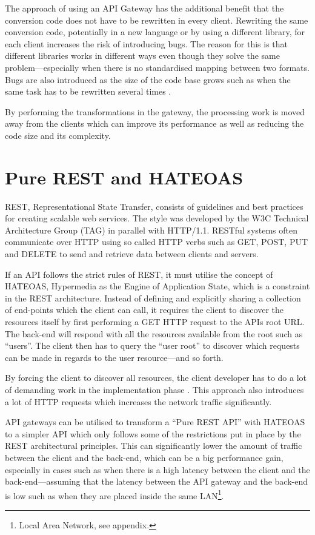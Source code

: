\documentclass{cslthse-msc}
\begin{document}
The approach of using an API Gateway has the additional benefit that the conversion code does not have to be rewritten in every client. Rewriting the same conversion code, potentially in a new language or by using a different library, for each client increases the risk of introducing bugs. The reason for this is that different libraries works in different ways even though they solve the same problem---especially when there is no standardised mapping between two formats. Bugs are also introduced as the size of the code base grows such as when the same task has to be rewritten several times \cite[page 521]{code_complete}. 

By performing the transformations in the gateway, the processing work is moved away from the clients which can improve its performance as well as reducing the code size and its complexity.

\section{Pure REST and HATEOAS}
REST, Representational State Transfer, consists of guidelines and best practices for creating scalable web services. The style was developed by the W3C Technical Architecture Group (TAG) in parallel with HTTP/1.1. RESTful systems often communicate over HTTP using so called HTTP verbs such as GET, POST, PUT and DELETE to send and retrieve data between clients and servers. 

If an API follows the strict rules of REST, it must utilise the concept of HATEOAS, Hypermedia as the Engine of Application State, which is a constraint in the REST architecture. Instead of defining and explicitly sharing a collection of end-points which the client can call, it requires the client to discover the resources itself by first performing a GET HTTP request to the APIs root URL. The back-end will respond with all the resources available from the root such as \enquote{users}. The client then has to query the \enquote{user root} to discover which requests can be made in regards to the user resource---and so forth. 

By forcing the client to discover all resources, the client developer has to do a lot of demanding work in the implementation phase \cite[page 62]{AASG}. This approach also introduces a lot of HTTP requests which increases the network traffic significantly.

API gateways can be utilised to transform a \enquote{Pure REST API} with HATEOAS to a simpler API which only follows some of the restrictions put in place by the REST architectural principles. This can significantly lower the amount of traffic between the client and the back-end, which can be a big performance gain, especially in cases such as when there is a high latency between the client and the back-end---assuming that the latency between the API gateway and the back-end is low such as when they are placed inside the same LAN\footnote{Local Area Network, see appendix.}.
\end{document}
